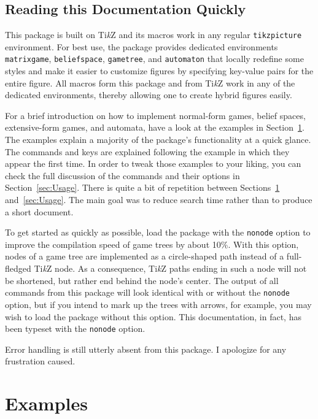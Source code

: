 \documentclass{article}
\def\TikZ{Ti\emph{k}Z\xspace}
\begin{document}
\subsection{Reading this Documentation Quickly}

This package is built on \TikZ and its macros work in any regular \texttt{tikzpicture} environment. For best use, the package provides dedicated environments \texttt{matrixgame}, \texttt{beliefspace}, \texttt{gametree}, and \texttt{automaton} that locally redefine some styles and make it easier to customize figures by specifying key-value pairs for the entire figure. All macros form this package and from \TikZ work in any of the dedicated environments, thereby allowing one to create hybrid figures easily.

For a brief introduction on how to implement normal-form games, belief spaces, extensive-form games, and automata, have a look at the examples in Section~\ref{sec:Examples}. The examples explain a majority of the package's functionality at a quick glance. The commands and keys are explained following the example in which they appear the first time. In order to tweak those examples to your liking, you can check the full discussion of the commands and their options in Section~\ref{sec:Usage}. There is quite a bit of repetition between Sections~\ref{sec:Examples} and~\ref{sec:Usage}. The main goal was to reduce search time rather than to produce a short document.

To get started as quickly as possible, load the package with the \texttt{nonode} option to improve the compilation speed of game trees by about 10\%. With this option, nodes of a game tree are implemented as a circle-shaped path instead of a full-fledged \TikZ node. As a consequence, \TikZ paths ending in such a node will not be shortened, but rather end behind the node's center. The output of all commands from this package will look identical with or without the \texttt{nonode} option, but if you intend to mark up the trees with arrows, for example, you may wish to load the package without this option. This documentation, in fact, has been typeset with the \texttt{nonode} option.

Error handling is still utterly absent from this package. I apologize for any frustration caused.

\section{Examples}\label{sec:Examples}
\end{document}

